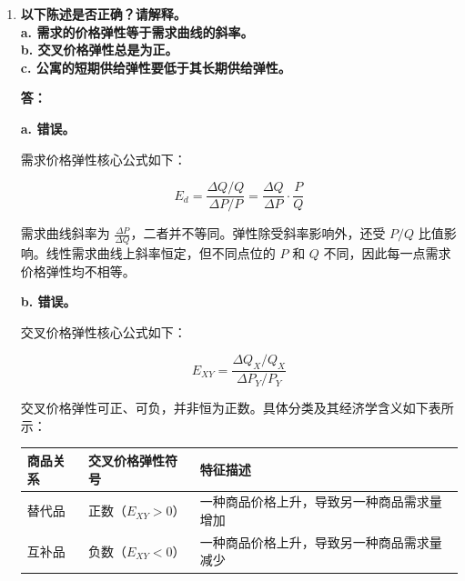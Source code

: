 \begin{enumerate}[label=\textbf{\arabic*.}, leftmargin=*]
		\textbf{纸巾（非耐用消耗品）：长期需求价格弹性更大。}在短期内，人们的生活习惯和消费结构可能很难改变，对价格变化并没有太多反应；但是在长期中，人们会有充足的时间寻找替代品（如改用抹布)或者是改变自己的生活习惯，因此在这个过程中，需求量对于价格的反映就会变得更加灵敏一些。
		
		\textbf{电视机（耐用品）：短期需求价格弹性更大。}因为电视机购买往往具有一定延迟性。当电视机的价格短期上涨时，人们完全可以选择继续使用旧电视而不换新，其短期需求量会剧烈下降（弹性大）；但是在长期里，旧电视将最终报废，即便面临高昂的成本也必须要购买，所以从长期来看，它只有相对较小的需求量（弹性小）。
		
		\item \textbf{以下陈述是否正确？请解释。\\
			a. 需求的价格弹性等于需求曲线的斜率。\\
			b. 交叉价格弹性总是为正。\\
			c. 公寓的短期供给弹性要低于其长期供给弹性。}
		
		\textbf{答：}
		
		\textbf{a. 错误。}
		
		需求价格弹性核心公式如下：

			$$E_d = \frac{\Delta Q/Q}{\Delta P/P} = \frac{\Delta Q}{\Delta P} \cdot \frac{P}{Q}$$

		
		需求曲线斜率为 $\frac{\Delta P}{\Delta Q}$，二者并不等同。弹性除受斜率影响外，还受 $P/Q$ 比值影响。线性需求曲线上斜率恒定，但不同点位的 $P$ 和 $Q$ 不同，因此每一点需求价格弹性均不相等。
		
		\textbf{b. 错误。}
		
		交叉价格弹性核心公式如下：

			$$E_{XY} = \frac{\Delta Q_X/Q_X}{\Delta P_Y/P_Y}$$

		
		交叉价格弹性可正、可负，并非恒为正数。具体分类及其经济学含义如下表所示：
		
		\begin{center}
			\renewcommand{\tabularxcolumn}[1]{m{#1}}
			\begin{tabularx}{\textwidth}{>{\centering\arraybackslash}X >{\centering\arraybackslash}X >{\centering\arraybackslash}X}
				\toprule
				\textbf{商品关系} & \textbf{交叉价格弹性符号} & \textbf{特征描述} \\
				\midrule
				替代品 & 正数（$E_{XY} > 0$） & 一种商品价格上升，导致另一种商品需求量增加 \\
				互补品 & 负数（$E_{XY} < 0$） & 一种商品价格上升，导致另一种商品需求量减少 \\
				\bottomrule
			\end{tabularx}
		\end{center}


\end{enumerate}
